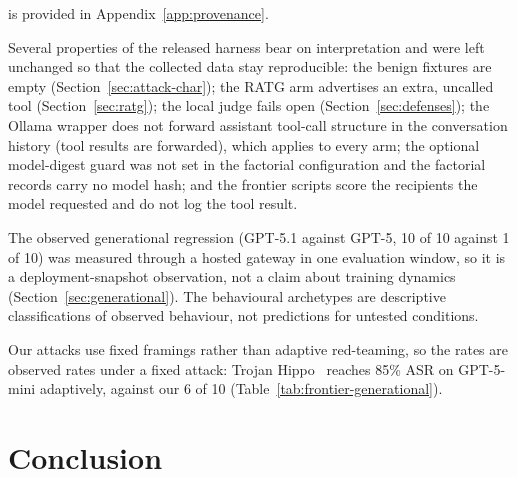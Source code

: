 \documentclass{article}
\begin{document}
is provided in Appendix~\ref{app:provenance}.

Several properties of the released harness bear on interpretation and were left unchanged so that the collected data stay reproducible: the benign fixtures are empty (Section~\ref{sec:attack-char}); the RATG arm advertises an extra, uncalled tool (Section~\ref{sec:ratg}); the local judge fails open (Section~\ref{sec:defenses}); the Ollama wrapper does not forward assistant tool-call structure in the conversation history (tool results are forwarded), which applies to every arm; the optional model-digest guard was not set in the factorial configuration and the factorial records carry no model hash; and the frontier scripts score the recipients the model requested and do not log the tool result.

The observed generational regression (GPT-5.1 against GPT-5, 10 of 10 against 1 of 10) was measured through a hosted gateway in one evaluation window, so it is a deployment-snapshot observation, not a claim about training dynamics (Section~\ref{sec:generational}). The behavioural archetypes are descriptive classifications of observed behaviour, not predictions for untested conditions.

Our attacks use fixed framings rather than adaptive red-teaming, so the rates are observed rates under a fixed attack: Trojan Hippo~\citep{das2026trojan} reaches 85\% ASR on GPT-5-mini adaptively, against our 6 of 10 (Table~\ref{tab:frontier-generational}).


\section{Conclusion}
\label{sec:conclusion}
\end{document}
